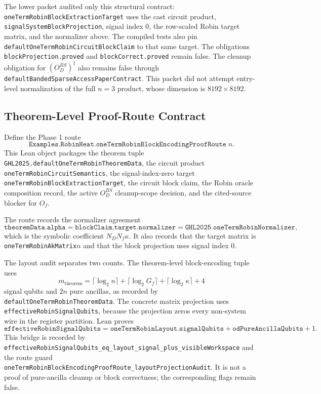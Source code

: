 The lower packet audited only this structural contract:
\texttt{oneTermRobinBlockExtractionTarget} uses the cast circuit product,
\texttt{signalSystemBlockProjection}, signal index \(0\), the row-scaled
Robin target matrix, and the normalizer above.  The compiled tests also pin
\texttt{defaultOneTermRobinCircuitBlockClaim} to that same target.  The
obligations \texttt{blockProjection.proved} and
\texttt{blockCorrect.proved} remain false.  The cleanup obligation for
\((O_D^{BS})^\dagger\) also remains false through
\texttt{defaultBandedSparseAccessPaperContract}.  This packet did not attempt
entry-level normalization of the full \(n=3\) product, whose dimension is
\(8192 \times 8192\).

\subsection{Theorem-Level Proof-Route Contract}

Define the Phase 1 route
\[
  \texttt{Examples.RobinHeat.oneTermRobinBlockEncodingProofRoute}\;n.
\]
This Lean object packages the theorem tuple
\texttt{GHL2025.defaultOneTermRobinTheoremData}, the circuit product
\texttt{oneTermRobinCircuitSemantics}, the signal-index-zero target
\texttt{oneTermRobinBlockExtractionTarget}, the circuit block claim, the
Robin oracle composition record, the active \(O_D^{BS}\) cleanup-scope
decision, and the cited-source blocker for \(O_f\).

The route records the normalizer agreement
\[
  \texttt{theoremData.alpha}
  =
  \texttt{blockClaim.target.normalizer}
  =
  \texttt{GHL2025.oneTermRobinNormalizer},
\]
which is the symbolic coefficient \(N_D N_f \kappa\).  It also records that
the target matrix is \texttt{oneTermRobinAkMatrix}\(n\) and that the block
projection uses signal index \(0\).

The layout audit separates two counts.  The theorem-level block-encoding tuple
uses
\[
  m_{\mathrm{theorem}}
  =
  \lceil\log_2 n\rceil+\lceil\log_2 G_f\rceil
  +\lceil\log_2\kappa\rceil+4
\]
signal qubits and \(2n\) pure ancillas, as recorded by
\texttt{defaultOneTermRobinTheoremData}.  The concrete matrix projection uses
\texttt{effectiveRobinSignalQubits}, because the projection zeros every
non-system wire in the register partition.  Lean proves
\[
  \texttt{effectiveRobinSignalQubits}
  =
  \texttt{oneTermRobinLayout.signalQubits}
  + \texttt{odPureAncillaQubits} + 1.
\]
This bridge is recorded by
\texttt{effectiveRobinSignalQubits\_eq\_layout\_signal\_plus\_visibleWorkspace}
and the route guard
\texttt{oneTermRobinBlockEncodingProofRoute\_layoutProjectionAudit}.  It is not
a proof of pure-ancilla cleanup or block correctness; the corresponding flags
remain false.

